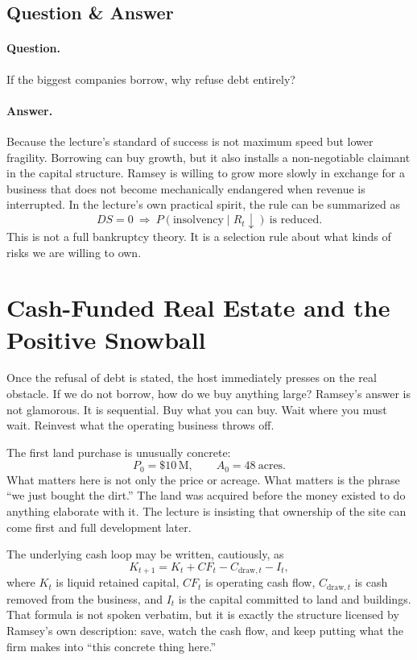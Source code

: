 \subsection{Question \& Answer}

\paragraph{Question.} If the biggest companies borrow, why refuse debt entirely?

\paragraph{Answer.} Because the lecture's standard of success is not maximum speed but lower fragility. Borrowing can buy growth, but it also installs a non-negotiable claimant in the capital structure. Ramsey is willing to grow more slowly in exchange for a business that does not become mechanically endangered when revenue is interrupted. In the lecture's own practical spirit, the rule can be summarized as
\begin{equation}
DS=0 \ \Rightarrow\ P(\text{insolvency}\mid R_t\downarrow)\ \text{is reduced}.
\end{equation}
This is not a full bankruptcy theory. It is a selection rule about what kinds of risks we are willing to own.

\section{Cash-Funded Real Estate and the Positive Snowball}

Once the refusal of debt is stated, the host immediately presses on the real obstacle. If we do not borrow, how do we buy anything large? Ramsey's answer is not glamorous. It is sequential. Buy what you can buy. Wait where you must wait. Reinvest what the operating business throws off.

The first land purchase is unusually concrete:
\begin{equation}
P_0=\$10\,\mathrm{M},\qquad A_0=48\ \text{acres}.
\end{equation}
What matters here is not only the price or acreage. What matters is the phrase ``we just bought the dirt.'' The land was acquired before the money existed to do anything elaborate with it. The lecture is insisting that ownership of the site can come first and full development later.

The underlying cash loop may be written, cautiously, as
\begin{equation}
K_{t+1}=K_t+CF_t-C_{\mathrm{draw},t}-I_t,
\end{equation}
where \(K_t\) is liquid retained capital, \(CF_t\) is operating cash flow, \(C_{\mathrm{draw},t}\) is cash removed from the business, and \(I_t\) is the capital committed to land and buildings. That formula is not spoken verbatim, but it is exactly the structure licensed by Ramsey's own description: save, watch the cash flow, and keep putting what the firm makes into ``this concrete thing here.''

